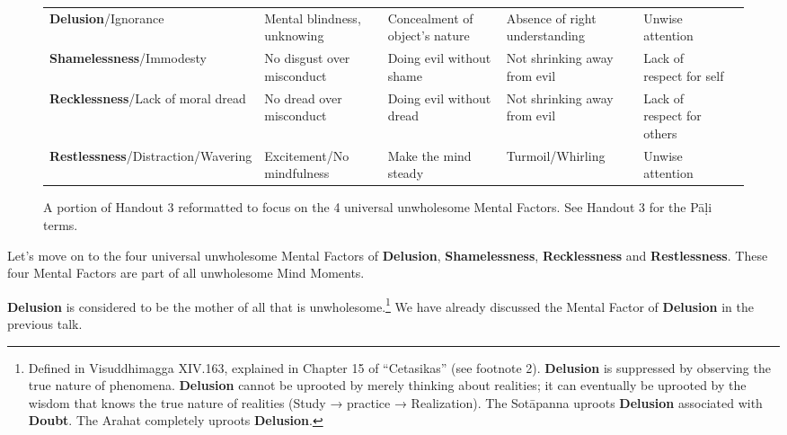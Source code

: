 \begin{figure} [H]

\setlength{\tabcolsep}{0pt}
\renewcommand{\arraystretch}{1.1}

\begin{tabular}{P{0.25\textwidth} | C{.185\textwidth} C{0.185\textwidth} C{0.185\textwidth} C{0.195\textwidth} m{0mm}}
\toprule
 &  &  &  & \\
\midrule
\textbf{Delusion}/\newline Ignorance & Mental blindness, unknowing & Concealment of object’s nature & Absence of right understanding & Unwise attention &\\[9mm]
\textbf{Shamelessness}/\newline Immodesty & No disgust over misconduct & Doing evil without shame & Not shrinking away from evil & Lack of respect for self &\\[9mm]
\textbf{Recklessness}/\newline Lack of moral dread & No dread over misconduct & Doing evil without dread & Not shrinking away from evil & Lack of respect for others &\\[9mm]
\textbf{Restlessness}/\newline Distraction/Wavering & Excitement/\newline No mindfulness & Make the mind steady & Turmoil/\newline Whirling & Unwise attention &\\[9mm]
\bottomrule
\end{tabular}

\caption{A portion of Handout 3 reformatted to focus on the 4 universal unwholesome Mental Factors. See Handout 3 for the Pāḷi terms.}

\end{figure}

Let’s move on to the four universal unwholesome Mental Factors of \textbf{Delusion}, \textbf{Shamelessness}, \textbf{Recklessness} and \textbf{Restlessness}. These four Mental Factors are part of all unwholesome Mind Moments.

\textbf{Delusion} is considered to be the mother of all that is unwholesome.\footnote{Defined in Visuddhimagga XIV.163, explained in Chapter 15 of “Cetasikas” (see footnote 2). \textbf{Delusion} is suppressed by observing the true nature of phenomena. \textbf{Delusion} cannot be uprooted by merely thinking about realities; it can eventually be uprooted by the wisdom that knows the true nature of realities (Study → \color{blue} practice\color{black} → Realization). The Sotāpanna uproots \textbf{Delusion} associated with \textbf{Doubt}. The Arahat completely uproots \textbf{Delusion}.} We have already discussed the Mental Factor of \textbf{Delusion} in the previous talk.

